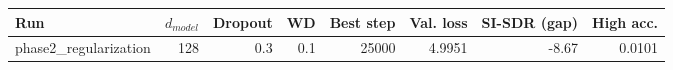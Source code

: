 \begin{tabular}{lrrrrrrr}
\toprule
Run & $d_{model}$ & Dropout & WD & Best step & Val. loss & SI-SDR (gap) & High acc. \\
\midrule
phase2\_regularization & 128 & 0.3 & 0.1 & 25000 & 4.9951 & -8.67 & 0.0101 \\
\bottomrule
\end{tabular}
